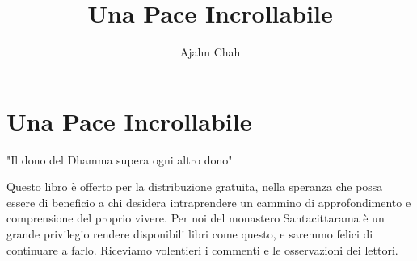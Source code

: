 \documentclass[11pt,twoside,final]{memoir}
\title{Una Pace Incrollabile}
\subtitle{}
\author{Ajahn Chah}
\date{}
\begin{document}
\emptysheet


\frontmatter*


\cleartoverso
\thispagestyle{empty}



\cleartorecto
\thispagestyle{empty}



\cleartoverso
\thispagestyle{empty}



\cleartorecto
\thispagestyle{empty}



\cleartorecto
\tableofcontents*

\mainmatter*

\book{\thetitle}

\setcounter{chapter}{0}


\chapter{Una Pace Incrollabile}



\backmatter



"Il dono del Dhamma supera ogni altro dono"

Questo libro è offerto per la distribuzione gratuita, nella speranza che
possa essere di beneficio a chi desidera intraprendere un cammino di
approfondimento e comprensione del proprio vivere. Per noi del monastero
Santacittarama è un grande privilegio rendere disponibili libri come
questo, e saremmo felici di continuare a farlo. Riceviamo volentieri i
commenti e le osservazioni dei lettori.
\end{document}
